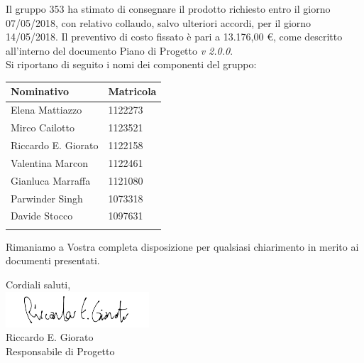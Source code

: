 \documentclass[openany, a4paper, 12pt]{letter}
\newcommand{\Valentina}{Valentina Marcon\xspace}
\newcommand{\Mirco}{Mirco Cailotto\xspace}
\newcommand{\Riccardo}{Riccardo E. Giorato\xspace}
\newcommand{\Davide}{Davide Stocco\xspace}
\newcommand{\Parwinder}{Parwinder Singh\xspace}
\newcommand{\Elena}{Elena Mattiazzo\xspace}
\newcommand{\Gianluca}{Gianluca Marraffa\xspace}
\newcommand{\vrdue}{\textit{v 2.0.0}\xspace} %
\begin{document}
\begin{letter}
		
		Il gruppo 353 ha stimato di consegnare il prodotto richiesto entro il giorno 07/05/2018,
		con relativo collaudo, salvo ulteriori accordi, per il giorno 14/05/2018. Il preventivo di costo
		fissato è pari a 13.176,00 \euro, come descritto all'interno del documento Piano di Progetto \vrdue.
		\medskip \\
		Si riportano di seguito i nomi dei componenti del gruppo:\\
		
		\renewcommand*{\arraystretch}{1.2}
		\begin{longtable}[H]{p{6cm}p{2.5cm}}
			\rowcolor{CHeader}   
			\color{CHeaderText} \textbf{Nominativo} & \color{CHeaderText} \textbf{Matricola}\\
			\endhead
			\Elena & 1122273 \\
			\Mirco & 1123521 \\
			\Riccardo & 1122158 \\
			\Valentina &  1122461 \\
			\Gianluca & 1121080 \\
			\Parwinder & 1073318 \\
			\Davide & 1097631 \\
			\hiderowcolors
		\end{longtable}
		
		Rimaniamo a Vostra completa disposizione per qualsiasi chiarimento in merito ai documenti presentati.
		\begin{flushleft}
			Cordiali saluti,\\
			\includegraphics[width=0.4\textwidth]{firmaResp}\\
			\Riccardo\\
			Responsabile di Progetto\\
		\end{flushleft}
	\end{letter}
\end{document}
